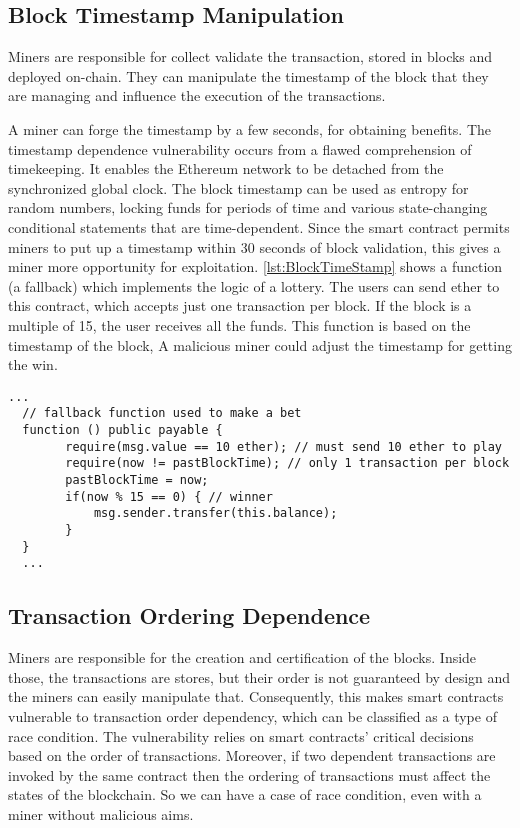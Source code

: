 \documentclass[a4paper,sigconf, language=french,
language=german, language=spanish, language=english]{acmart}
\begin{document}
\subsection{Block Timestamp Manipulation} 
Miners are responsible for collect validate the transaction, stored in blocks and deployed on-chain.
They can manipulate the timestamp of the block that they are managing and influence the execution of the transactions.

A miner can forge the timestamp by a few seconds, for obtaining benefits. 
The timestamp dependence vulnerability occurs from a flawed comprehension of timekeeping. It enables the Ethereum network to be detached from the synchronized global clock. 
The block timestamp can be used as entropy for random numbers, locking funds for periods of time and various state-changing 
conditional statements that are time-dependent. Since the smart contract permits miners to put up a
timestamp within 30 seconds of block validation, this gives a miner more opportunity for exploitation.
\autoref{lst:BlockTimeStamp} shows a function (a fallback) which implements the logic of a lottery. The users can send ether to this contract, which 
accepts just one transaction per block. If the block is a multiple of 15, the user receives all the funds. This function is based on the timestamp of the block, 
A malicious miner could adjust the timestamp for getting the win.
\begin{lstlisting}[language=Solidity,caption={Block Timestamp},label={lst:BlockTimeStamp}]
  ...  
  // fallback function used to make a bet
  function () public payable {
        require(msg.value == 10 ether); // must send 10 ether to play
        require(now != pastBlockTime); // only 1 transaction per block
        pastBlockTime = now;
        if(now % 15 == 0) { // winner
            msg.sender.transfer(this.balance);
        }
  }
  ...
\end{lstlisting}

\subsection{Transaction Ordering Dependence} 

Miners are responsible for the creation and certification of the blocks. 
Inside those, the transactions are stores, but their order is not guaranteed by 
design and the miners can easily manipulate that. Consequently, this makes smart contracts vulnerable to transaction
order dependency, which can be classified as a type of race condition. The vulnerability relies on smart contracts' critical decisions 
based on the order of transactions. Moreover, if two dependent transactions are invoked by the same contract then the ordering of transactions must affect the states of the blockchain. 
So we can have a case of race condition, even with a miner without malicious aims.
\end{document}
